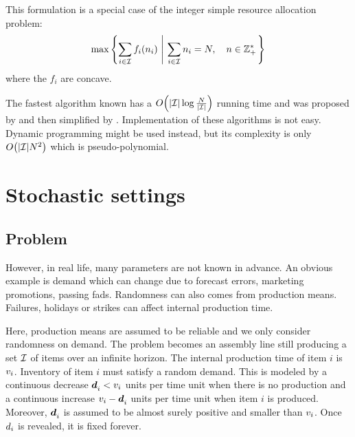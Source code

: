 \medskip


This formulation is a special case of the integer simple resource allocation problem:
\begin{equation}
  \max\crbracket{\sum_{i\in\REF} f_i\bracket{\freq_i}\ \left|\ \sum_{i\in\REF}\freq_i=\nbsetups,\quad\freq\in \ZZ_+^*\right.}
\end{equation}
where the $f_i$ are concave.


The fastest algorithm known has a $O\bracket{\card{\REF}\log{\frac{\nbsetups}{\card{\REF}}}}$ running time and was proposed by \citet{Frederickson1982} and then simplified by \citet{Hochbaum1994}.
Implementation of these algorithms is not easy.
Dynamic programming might be used instead, but its complexity is only $O\bracket{\card{\REF}\nbsetups^2}$ which is pseudo-polynomial.


\section{Stochastic settings}


\subsection{Problem}
\label{sec:lot-size:single-line:stochastic:problem}


However, in real life, many parameters are not known in advance.
An obvious example is demand which can change due to forecast errors, marketing promotions, passing fads.
Randomness can also comes from production means.
Failures, holidays or strikes can affect internal production time.


Here, production means are assumed to be reliable and we only consider randomness on demand.
The problem becomes an assembly line still producing a set $\mathcal{I}$ of items over an infinite horizon.
The internal production time of item $i$ is $v_i$.
Inventory of item $i$ must satisfy a random demand.
This is modeled by a continuous decrease $\va\demand_i<\rate_i$ units per time unit when there is no production and a continuous increase $\rate_i-\va\demand_i$ units per time unit when item $i$ is produced.
Moreover, $\va\demand_i$ is assumed to be almost surely positive and smaller than $v_i$.
Once $d_i$ is revealed, it is fixed forever.


